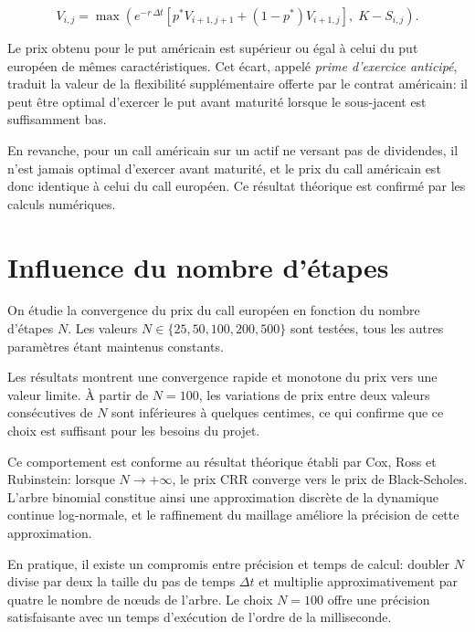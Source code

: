 \documentclass[11pt]{report}
\begin{document}
\[
V_{i,j} = \max\!\left(e^{-r\,\Delta t}\left[p^* V_{i+1,j+1} + (1-p^*)V_{i+1,j}\right],\;
K - S_{i,j}\right).
\]

Le prix obtenu pour le put américain est supérieur ou égal à celui du put européen de mêmes caractéristiques. Cet écart, appelé \textit{prime d'exercice anticipé}, traduit la valeur de la flexibilité supplémentaire offerte par le contrat américain: il peut être optimal d'exercer le put avant maturité lorsque le sous-jacent est suffisamment bas.

En revanche, pour un call américain sur un actif ne versant pas de dividendes, il n'est jamais optimal d'exercer avant maturité, et le prix du call américain est donc identique à celui du call européen. Ce résultat théorique est confirmé par les calculs numériques.

\section{Influence du nombre d'étapes}
\label{sec:influence_n}

On étudie la convergence du prix du call européen en fonction du nombre d'étapes $N$. Les valeurs $N \in \{25, 50, 100, 200, 500\}$ sont testées, tous les autres paramètres étant maintenus constants.

Les résultats montrent une convergence rapide et monotone du prix vers une valeur limite. À partir de $N = 100$, les variations de prix entre deux valeurs consécutives de $N$ sont inférieures à quelques centimes, ce qui confirme que ce choix est suffisant pour les besoins du projet.

Ce comportement est conforme au résultat théorique établi par Cox, Ross et Rubinstein: lorsque $N \to +\infty$, le prix CRR converge vers le prix de Black-Scholes. L'arbre binomial constitue ainsi une approximation discrète de la dynamique continue log-normale, et le raffinement du maillage
améliore la précision de cette approximation.

En pratique, il existe un compromis entre précision et temps de calcul: doubler $N$ divise par deux la taille du pas de temps $\Delta t$ et multiplie approximativement par quatre le nombre de nœuds de l'arbre. Le choix $N = 100$ offre une précision satisfaisante avec un temps d'exécution de l'ordre de la milliseconde.


\end{document}
